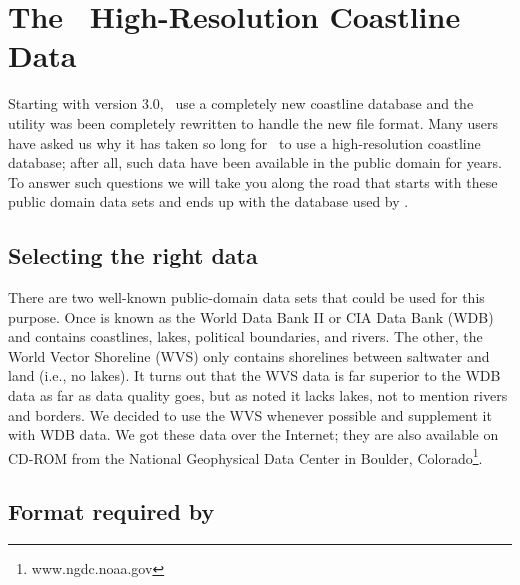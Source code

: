 %
%
\chapter{The \gmt\ High-Resolution Coastline Data}
\thispagestyle{headings}

Starting with version 3.0, \GMT\ use a completely new coastline
database and the  utility was been completely
rewritten to handle the new file format.  Many users have asked
us why it has taken so long for \GMT\ to use a high-resolution
coastline database; after all, such data have been available in
the public domain for years.  To answer such questions we will
take you along the road that starts with these public domain
data sets and ends up with the database used by \GMT.

\section{Selecting the right data} 

There are two well-known public-domain data sets that could be
used for this purpose.  Once is known as the World Data Bank II
or CIA Data Bank (WDB) and contains coastlines, lakes, political
boundaries, and rivers.  The other, the World Vector Shoreline
(WVS) only contains shorelines between saltwater and land (i.e.,
no lakes).  It turns out that the WVS data is far superior to the
WDB data as far as data quality goes, but as noted it lacks lakes,
not to mention rivers and borders.  We decided to use the WVS
whenever possible and supplement it with WDB data.  We got these
data over the Internet; they are also available on CD-ROM from
the National Geophysical Data Center in Boulder, Colorado\footnote{
www.ngdc.noaa.gov}.

\section{Format required by \gmt} 

